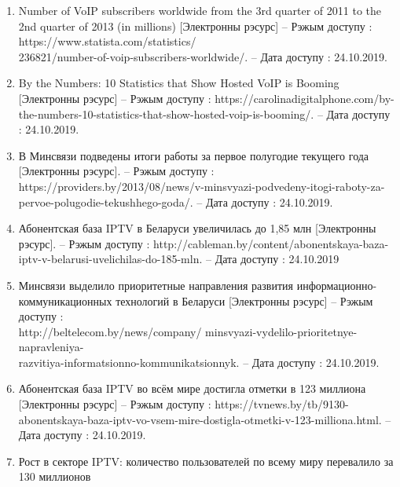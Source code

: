 
\begin{enumerate}[{label=\arabic{*}}]
    \item Number of VoIP subscribers worldwide from the 3rd quarter of 2011 to the 2nd quarter of 2013 (in millions)
          [Электронны рэсурс] --
          Рэжым доступу : 
          https://www.statista.com/statistics/ \\
          236821/number-of-voip-subscribers-worldwide/. --
          Дата доступу : 24.10.2019.
          \label{stat: VoIP-world-2013}
    \item By the Numbers: 10 Statistics that Show Hosted VoIP is Booming
          [Электронны рэсурс] --
          Рэжым доступу : 
          https://carolinadigitalphone.com/by-the-numbers-10-statistics-that-show-hosted-voip-is-booming/. --
          Дата доступу : 24.10.2019.
          \label{stat: VoIP-world-2018}
    \item В Минсвязи подведены итоги работы
          за первое полугодие текущего года [Электрон\-ны рэсурс]. --
          Рэжым доступу : https://providers.by/2013/08/news/v-minsvyazi-podvedeny-itogi-raboty-za-pervoe-polugodie-tekushhego-goda/. --
          Дата доступу : 24.10.2019.
          \label{stat: IPTV-2013}
    \item  Абонентская база IPTV в Беларуси увеличилась до 1,85 млн
           [Электронны рэсурс]. --
           Рэжым доступу : http://cableman.by/content/abonentskaya-baza-iptv-v-belarusi-uvelichilas-do-185-mln. --
           Дата доступу : 24.10.2019
           \label{stat: IPTV-2018}
    \item Минсвязи выделило приоритетные направления
          развития ин\-фор\-ма\-ци\-он\-но-ком\-му\-ни\-ка\-цион\-ных технологий в Беларуси [Электронны рэсурс] --
          Рэжым доступу : \\ http://beltelecom.by/news/company/          minsvyazi-vydelilo-prioritetnye-napravleniya- \\
          razvitiya-informatsionno-kommunikatsionnyk. --
          Дата доступу : 24.10.2019.
          \label{stat: IPTV-2017-2019}
    \item Абонентская база IPTV во всём мире достигла отметки в 123 миллиона
          [Электронны рэсурс] --
          Рэжым доступу : https://tvnews.by/tb/9130-abonentskaya-baza-iptv-vo-vsem-mire-dostigla-otmetki-v-123-milliona.html. --
          Дата доступу : 24.10.2019.
          \label{stat: IPTV-world-2015}
    \item Рост в секторе IPTV: количество пользователей по всему миру перевалило за 130 миллионов

\end{enumerate}
